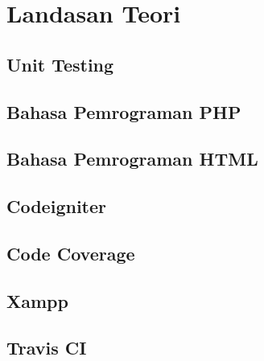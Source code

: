 \chapter{Landasan Teori}
\label{chap:teori}

\section{Unit Testing}
\label{unittesting}

\section{Bahasa Pemrograman PHP}
\label{php}

\section{Bahasa Pemrograman HTML}
\label{html}

\section{Codeigniter}
\label{ci}

\section{Code Coverage}
\label{codecoverage}

\section{Xampp}
\label{xampp}

\section{Travis CI}
\label{travis}


